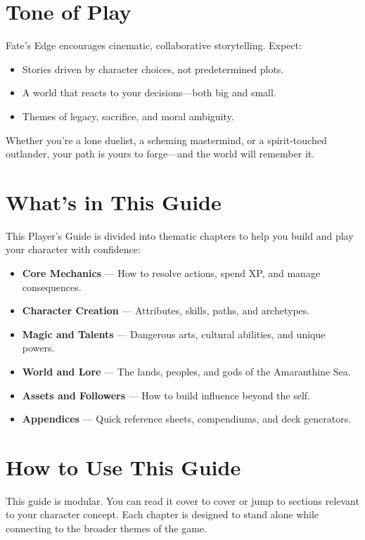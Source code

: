 \section*{Tone of Play}

Fate’s Edge encourages cinematic, collaborative storytelling. Expect:
\begin{itemize}
  \item Stories driven by character choices, not predetermined plots.
  \item A world that reacts to your decisions—both big and small.
  \item Themes of legacy, sacrifice, and moral ambiguity.
\end{itemize}

Whether you’re a lone duelist, a scheming mastermind, or a spirit-touched outlander, your path is yours to forge—and the world will remember it.

\section*{What’s in This Guide}

This Player’s Guide is divided into thematic chapters to help you build and play your character with confidence:

\begin{itemize}
  \item \textbf{Core Mechanics} — How to resolve actions, spend XP, and manage consequences.
  \item \textbf{Character Creation} — Attributes, skills, paths, and archetypes.
  \item \textbf{Magic and Talents} — Dangerous arts, cultural abilities, and unique powers.
  \item \textbf{World and Lore} — The lands, peoples, and gods of the Amaranthine Sea.
  \item \textbf{Assets and Followers} — How to build influence beyond the self.
  \item \textbf{Appendices} — Quick reference sheets, compendiums, and deck generators.
\end{itemize}

\section*{How to Use This Guide}

This guide is modular. You can read it cover to cover or jump to sections relevant to your character concept. Each chapter is designed to stand alone while connecting to the broader themes of the game.


